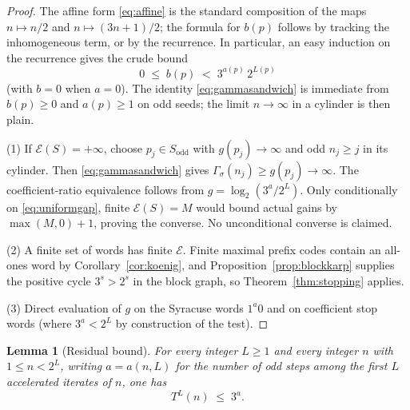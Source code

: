 \documentclass[11pt]{amsart}
\newtheorem{lemma}[theorem]{Lemma}
\theoremstyle{definition}
\theoremstyle{remark}
\begin{document}
\begin{proof}
The affine form \eqref{eq:affine} is the standard composition of the maps $n\mapsto n/2$ and $n\mapsto(3n+1)/2$; the formula for $b(p)$ follows by tracking the inhomogeneous term, or by the recurrence. In particular, an easy induction on the recurrence gives the crude bound
\begin{equation}\label{eq:bcrude}
0 \;\le\; b(p) \;<\; 3^{a(p)}\,2^{L(p)}
\end{equation}
(with $b=0$ when $a=0$). The identity \eqref{eq:gammasandwich} is immediate from $b(p)\ge 0$ and $a(p)\ge 1$ on odd seeds; the limit $n\to\infty$ in a cylinder is then plain.

(1) If $\mathcal E(S)=+\infty$, choose $p_j\in S_{\mathrm{odd}}$ with $g(p_j)\to\infty$ and odd $n_j\ge j$ in its cylinder. Then \eqref{eq:gammasandwich} gives $\Gamma_\sigma(n_j)\ge g(p_j)\to\infty$. The coefficient-ratio equivalence follows from $g=\log_2(3^a/2^L)$. Only conditionally on \eqref{eq:uniformgap}, finite $\mathcal E(S)=M$ would bound actual gains by $\max(M,0)+1$, proving the converse. No unconditional converse is claimed.

(2) A finite set of words has finite $\mathcal{E}$. Finite maximal prefix codes contain an all-ones word by Corollary~\ref{cor:koenig}, and Proposition~\ref{prop:blockkarp} supplies the positive cycle $3^{s}>2^{s}$ in the block graph, so Theorem~\ref{thm:stopping} applies.

(3) Direct evaluation of $g$ on the Syracuse words $1^{a}0$ and on coefficient stop words (where $3^{a}<2^{L}$ by construction of the test).
\end{proof}

\begin{lemma}[Residual bound]\label{lem:residual}
For every integer $L\ge 1$ and every integer $n$ with $1\le n<2^{L}$, writing $a=a(n,L)$ for the number of odd steps among the first $L$ accelerated iterates of $n$, one has
\[
T^{L}(n) \;\le\; 3^{a}.
\]
\end{lemma}
\end{document}
